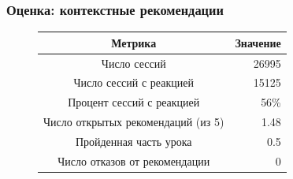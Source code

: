 \documentclass{beamer}
\begin{document}
\begin{frame}\frametitle{Оценка: контекстные рекомендации}
\normalsize
    \begin{figure} 
    \begin{table}
        \centering
        \begin{tabular}{ c | r }
          \hline
          Метрика & Значение \\
          \hline		
          \hline
          Число сессий & 26995 \\
          Число сессий с реакцией & 15125 \\
          Процент сессий с реакцией &  56\% \\
          Число открытых рекомендаций (из 5) & 1.48 \\
          Пройденная часть урока & 0.5 \\
          Число отказов от рекомендации & 0 \\
          \hline  
        \end{tabular}
    \end{table}
%
      \centering
      \hfill
    \end{figure}
\end{frame}
\end{document}
